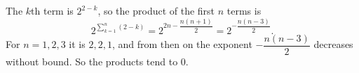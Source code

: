 The $k$th term is $2^{2-k}$, so the product of the first $n$ terms is
\[2^{\sum_{k=1}^n(2-k)}=2^{2n-\dfrac{n(n+1)}{2}}=2^{-\dfrac{n(n-3)}{2}}.\]
For $n=1,2,3$ it is $2,2,1$, and from then on the exponent $-\dfrac{n(n-3)}{2}$ decreases without bound. So the products tend to $\boxed{0}$.
